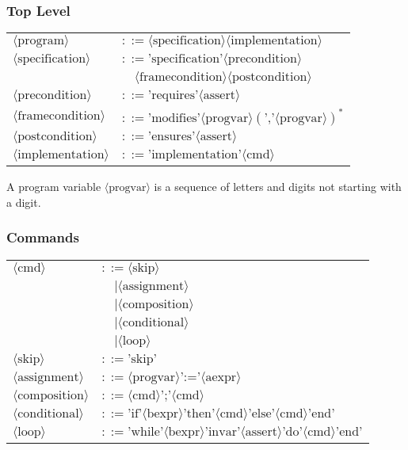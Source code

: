\begin{multicols}{2}
\subsubsection{Top Level}
\begin{tabularx}{\linewidth}{Xl}
  $\langle \text{program} \rangle$ & $::= \langle \text{specification} \rangle \langle \text{implementation} \rangle $\\
  $\langle \text{specification} \rangle$ & $::= \text{'specification'} \langle \text{precondition} \rangle$\\
   & $\quad \langle \text{framecondition} \rangle \langle \text{postcondition} \rangle$\\
  $\langle \text{precondition} \rangle$ & $::= \text{'requires'} \langle \text{assert} \rangle$\\
  $\langle \text{framecondition} \rangle$ & $::= \text{'modifies'} \langle \text{progvar} \rangle \left(\text{','} \langle \text{progvar} \rangle \right)^*$\\
  $\langle \text{postcondition} \rangle$ & $::= \text{'ensures'} \langle \text{assert} \rangle$\\
  $\langle \text{implementation} \rangle$ & $::= \text{'implementation'} \langle \text{cmd} \rangle$\\
\end{tabularx}

A program variable $\langle \text{progvar} \rangle$ is a sequence of letters and digits not starting with a digit.

\subsubsection{Commands}
\begin{tabularx}{\linewidth}{Xl}
  $\langle \text{cmd} \rangle$ & $::= \langle \text{skip} \rangle$\\
   & $\quad | \langle \text{assignment} \rangle$\\
   & $\quad | \langle \text{composition} \rangle$\\
   & $\quad | \langle \text{conditional} \rangle$\\
   & $\quad | \langle \text{loop} \rangle$\\
  $\langle \text{skip} \rangle$ & $::= \text{'skip'}$\\
  $\langle \text{assignment} \rangle$ & $::= \langle \text{progvar} \rangle \text{':='} \langle \text{aexpr} \rangle$\\
  $\langle \text{composition} \rangle$ & $::= \langle \text{cmd} \rangle \text{';'} \langle \text{cmd} \rangle$\\
  $\langle \text{conditional} \rangle$ & $::= \text{'if'} \langle \text{bexpr} \rangle \text{'then'} \langle \text{cmd} \rangle \text{'else'} \langle \text{cmd} \rangle \text{'end'}$\\
  $\langle \text{loop} \rangle$ & $::= \text{'while'} \langle \text{bexpr} \rangle \text{'invar'} \langle \text{assert} \rangle \text{'do'} \langle \text{cmd} \rangle \text{'end'}$\\
\end{tabularx}


\end{multicols}
